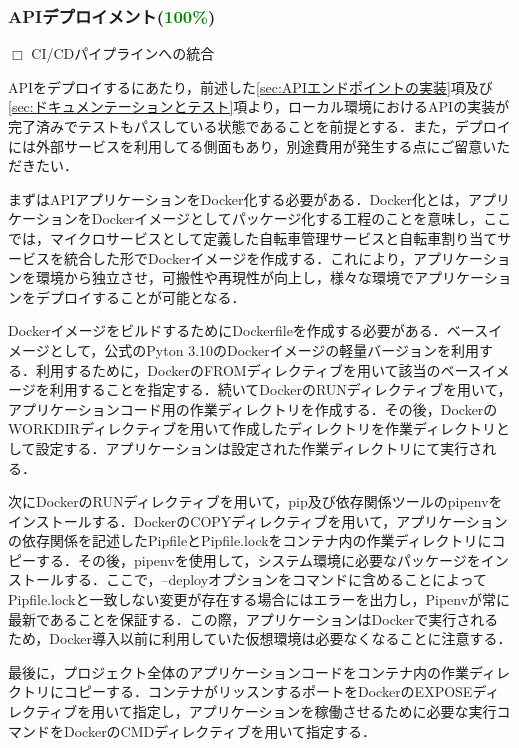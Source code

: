       \subsubsection{APIデプロイメント(\textcolor{green}{100\%})}
        \label{sec:APIデプロイメント}
          \par $\Box$ CI/CDパイプラインへの統合
          \par APIをデプロイするにあたり，前述した\ref{sec:APIエンドポイントの実装}項及び\ref{sec:ドキュメンテーションとテスト}項より，ローカル環境におけるAPIの実装が完了済みでテストもパスしている状態であることを前提とする．また，デプロイには外部サービスを利用してる側面もあり，別途費用が発生する点にご留意いただきたい．
          \par まずはAPIアプリケーションをDocker化する必要がある．Docker化とは，アプリケーションをDockerイメージとしてパッケージ化する工程のことを意味し，ここでは，マイクロサービスとして定義した自転車管理サービスと自転車割り当てサービスを統合した形でDockerイメージを作成する．これにより，アプリケーションを環境から独立させ，可搬性や再現性が向上し，様々な環境でアプリケーションをデプロイすることが可能となる．
          \par DockerイメージをビルドするためにDockerfileを作成する必要がある．ベースイメージとして，公式のPyton 3.10のDockerイメージの軽量バージョンを利用する．利用するために，DockerのFROMディレクティブを用いて該当のベースイメージを利用することを指定する．続いてDockerのRUNディレクティブを用いて，アプリケーションコード用の作業ディレクトリを作成する．その後，DockerのWORKDIRディレクティブを用いて作成したディレクトリを作業ディレクトリとして設定する．アプリケーションは設定された作業ディレクトリにて実行される．
          \par 次にDockerのRUNディレクティブを用いて，pip及び依存関係ツールのpipenvをインストールする．DockerのCOPYディレクティブを用いて，アプリケーションの依存関係を記述したPipfileとPipfile.lockをコンテナ内の作業ディレクトリにコピーする．その後，pipenvを使用して，システム環境に必要なパッケージをインストールする．ここで，--deployオプションをコマンドに含めることによってPipfile.lockと一致しない変更が存在する場合にはエラーを出力し，Pipenvが常に最新であることを保証する．この際，アプリケーションはDockerで実行されるため，Docker導入以前に利用していた仮想環境は必要なくなることに注意する．
          \par 最後に，プロジェクト全体のアプリケーションコードをコンテナ内の作業ディレクトリにコピーする．コンテナがリッスンするポートをDockerのEXPOSEディレクティブを用いて指定し，アプリケーションを稼働させるために必要な実行コマンドをDockerのCMDディレクティブを用いて指定する．
